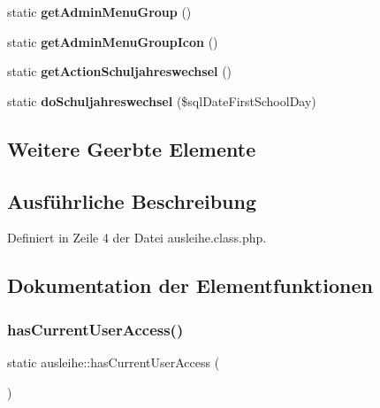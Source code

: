 \begin{DoxyCompactItemize}
\item 
\mbox{\label{classausleihe_a4d9778c818addc2c08a6b49e91eaca49}} 
static {\bfseries get\+Admin\+Menu\+Group} ()
\item 
\mbox{\label{classausleihe_ad96dece6f34749e6a4db6902ead0c49b}} 
static {\bfseries get\+Admin\+Menu\+Group\+Icon} ()
\item 
\mbox{\label{classausleihe_a224609a8eaa411b2275c71e83421965c}} 
static {\bfseries get\+Action\+Schuljahreswechsel} ()
\item 
\mbox{\label{classausleihe_a36748cdc04b915d4e2ef6cd8a1c0c604}} 
static {\bfseries do\+Schuljahreswechsel} (\$sql\+Date\+First\+School\+Day)
\end{DoxyCompactItemize}
\subsection*{Weitere Geerbte Elemente}


\subsection{Ausführliche Beschreibung}


Definiert in Zeile 4 der Datei ausleihe.\+class.\+php.



\subsection{Dokumentation der Elementfunktionen}
\mbox{\label{classausleihe_a1ba1a7a8985d74db6bd3a2520aafdfac}} 
\subsubsection{\texorpdfstring{has\+Current\+User\+Access()}{hasCurrentUserAccess()}}
{\footnotesize\ttfamily static ausleihe\+::has\+Current\+User\+Access (\begin{DoxyParamCaption}{ }\end{DoxyParamCaption})\hspace{0.3cm}{\ttfamily [static]}}


